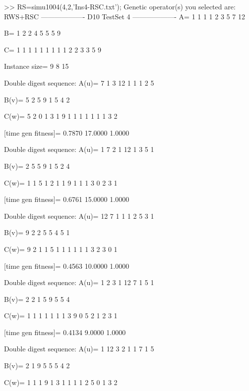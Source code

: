 >> RS=simu1004(4,2,'Ins4-RSC.txt');
Genetic operator(s) you selected are:
RWS+RSC
------------------- D10 TestSet 4 -------------------
A=
     1     1     1     1     2     3     5     7    12

B=
     1     2     2     4     5     5     5     9

C=
     1     1     1     1     1     1     1     1     1     2     2     3     3     5     9

Instance size=
     9     8    15

Double digest sequence:
A(u)=
     7     1     3    12     1     1     1     2     5

B(v)=
     5     2     5     9     1     5     4     2

C(w)=
     5     2     0     1     3     1     9     1     1     1     1     1     1     1     3     2

[time gen fitness]=
    0.7870   17.0000    1.0000

Double digest sequence:
A(u)=
     1     7     2     1    12     1     3     5     1

B(v)=
     2     5     5     9     1     5     2     4

C(w)=
     1     1     5     1     2     1     1     9     1     1     1     3     0     2     3     1

[time gen fitness]=
    0.6761   15.0000    1.0000

Double digest sequence:
A(u)=
    12     7     1     1     1     2     5     3     1

B(v)=
     9     2     2     5     5     4     5     1

C(w)=
     9     2     1     1     5     1     1     1     1     1     1     3     2     3     0     1

[time gen fitness]=
    0.4563   10.0000    1.0000

Double digest sequence:
A(u)=
     1     2     3     1    12     7     1     5     1

B(v)=
     2     2     1     5     9     5     5     4

C(w)=
     1     1     1     1     1     1     1     3     9     0     5     2     1     2     3     1

[time gen fitness]=
    0.4134    9.0000    1.0000

Double digest sequence:
A(u)=
     1    12     3     2     1     1     7     1     5

B(v)=
     2     1     9     5     5     5     4     2

C(w)=
     1     1     1     9     1     3     1     1     1     1     2     5     0     1     3     2

